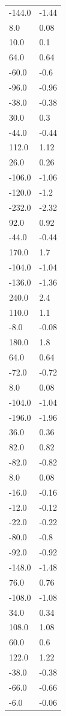 \begin{longtable}{ll}
-144.0 & -1.44 \\
8.0 & 0.08 \\
10.0 & 0.1 \\
64.0 & 0.64 \\
-60.0 & -0.6 \\
-96.0 & -0.96 \\
-38.0 & -0.38 \\
30.0 & 0.3 \\
-44.0 & -0.44 \\
112.0 & 1.12 \\
26.0 & 0.26 \\
-106.0 & -1.06 \\
-120.0 & -1.2 \\
-232.0 & -2.32 \\
92.0 & 0.92 \\
-44.0 & -0.44 \\
170.0 & 1.7 \\
-104.0 & -1.04 \\
-136.0 & -1.36 \\
240.0 & 2.4 \\
110.0 & 1.1 \\
-8.0 & -0.08 \\
180.0 & 1.8 \\
64.0 & 0.64 \\
-72.0 & -0.72 \\
8.0 & 0.08 \\
-104.0 & -1.04 \\
-196.0 & -1.96 \\
36.0 & 0.36 \\
82.0 & 0.82 \\
-82.0 & -0.82 \\
8.0 & 0.08 \\
-16.0 & -0.16 \\
-12.0 & -0.12 \\
-22.0 & -0.22 \\
-80.0 & -0.8 \\
-92.0 & -0.92 \\
-148.0 & -1.48 \\
76.0 & 0.76 \\
-108.0 & -1.08 \\
34.0 & 0.34 \\
108.0 & 1.08 \\
60.0 & 0.6 \\
122.0 & 1.22 \\
-38.0 & -0.38 \\
-66.0 & -0.66 \\
-6.0 & -0.06 \\

\end{longtable}
